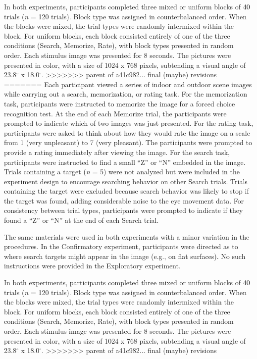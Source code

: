 \documentclass[
  english,
  man, donotrepeattitle,floatsintext]{apa6}
\begin{document}
In both experiments, participants completed three mixed or uniform blocks of 40 trials (\emph{n} = 120 trials). Block type was assigned in counterbalanced order. When the blocks were mixed, the trial types were randomly intermixed within the block. For uniform blocks, each block consisted entirely of one of the three conditions (Search, Memorize, Rate), with block types presented in random order. Each stimulus image was presented for 8 seconds. The pictures were presented in color, with a size of 1024 x 768 pixels, subtending a visual angle of 23.8\(^{\circ}\) x 18.0\(^{\circ}\).
>>>>>>> parent of a41c982... final (maybe) revisions
=======
Each participant viewed a series of indoor and outdoor scene images while carrying out a search, memorization, or rating task. For the memorization task, participants were instructed to memorize the image for a forced choice recognition test. At the end of each Memorize trial, the participants were prompted to indicate which of two images was just presented. For the rating task, participants were asked to think about how they would rate the image on a scale from 1 (very unpleasant) to 7 (very pleasant). The participants were prompted to provide a rating immediately after viewing the image. For the search task, participants were instructed to find a small \enquote{Z} or \enquote{N} embedded in the image. Trials containing a target (\emph{n} = 5) were not analyzed but were included in the experiment design to encourage searching behavior on other Search trials. Trials containing the target were excluded because search behavior was likely to stop if the target was found, adding considerable noise to the eye movement data. For consistency between trial types, participants were prompted to indicate if they found a \enquote{Z} or \enquote{N} at the end of each Search trial.

The same materials were used in both experiments with a minor variation in the procedures. In the Confirmatory experiment, participants were directed as to where search targets might appear in the image (e.g., on flat surfaces). No such instructions were provided in the Exploratory experiment.

In both experiments, participants completed three mixed or uniform blocks of 40 trials (\emph{n} = 120 trials). Block type was assigned in counterbalanced order. When the blocks were mixed, the trial types were randomly intermixed within the block. For uniform blocks, each block consisted entirely of one of the three conditions (Search, Memorize, Rate), with block types presented in random order. Each stimulus image was presented for 8 seconds. The pictures were presented in color, with a size of 1024 x 768 pixels, subtending a visual angle of 23.8\(^{\circ}\) x 18.0\(^{\circ}\).
>>>>>>> parent of a41c982... final (maybe) revisions
\end{document}
